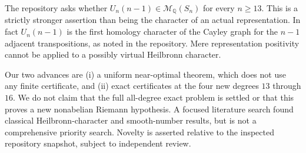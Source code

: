 \documentclass[11pt]{article}
\theoremstyle{remark}
\newcommand{\Cone}{\mathcal{M}}
\newcommand{\Q}{\mathbb Q}
\begin{document}
The repository asks whether $U_n(n-1)\in\Cone_{\Q}(S_n)$ for every $n\ge13$. This is a strictly stronger assertion than being the character of an actual representation. In fact $U_n(n-1)$ is the first homology character of the Cayley graph for the $n-1$ adjacent transpositions, as noted in the repository. Mere representation positivity cannot be applied to a possibly virtual Heilbronn character.

Our two advances are (i) a uniform near-optimal theorem, which does not use any finite certificate, and (ii) exact certificates at the four new degrees $13$ through $16$. We do not claim that the full all-degree exact problem is settled or that this proves a new nonabelian Riemann hypothesis. A focused literature search found classical Heilbronn-character and smooth-number results, but is not a comprehensive priority search. Novelty is asserted relative to the inspected repository snapshot, subject to independent review.
\end{document}
